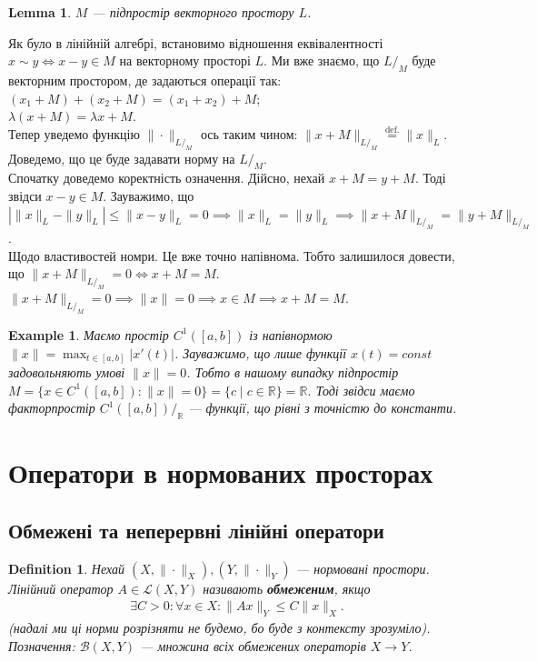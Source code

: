 \documentclass[a4paper, 10pt]{article}
\theoremstyle{theoremdd}
\theoremstyle{theoremdd}
\newtheorem{definition}[theorem]{Definition}
\theoremstyle{theoremdd}
\theoremstyle{theoremdd}
\newtheorem{example}[theorem]{Example}
\theoremstyle{theoremdd}
\theoremstyle{theoremdd}
\theoremstyle{theoremdd}
\newtheorem{lemma}[theorem]{Lemma}
\theoremstyle{theoremdd}
\begin{document}
\begin{lemma}
$M$ --- підпростір векторного простору $L$.
\end{lemma}

\noindent
Як було в лінійній алгебрі, встановимо відношення еквівалентності $x \sim y \iff x - y \in M$ на векторному просторі $L$. Ми вже знаємо, що $L/_M$ буде векторним простором, де задаються операції так:\\
$(x_1+M) + (x_2+M) = (x_1+x_2) + M$;\\
$\lambda(x+M) = \lambda x + M$.\\
Тепер уведемо функцію $\| \cdot\|_{L/_M}$ ось таким чином: $\| x+M \|_{L/_M} \overset{\text{def.}}{=} \|x\|_L$. Доведемо, що це буде задавати норму на $L/_M$.\\
Спочатку доведемо коректність означення. Дійсно, нехай $x+M = y+M$. Тоді звідси $x-y \in M$. Зауважимо, що\\
$| \|x \|_L - \|y\|_L | \leq \|x - y \|_L = 0 \implies \|x\|_L = \|y\|_L \implies \|x+M\|_{L/_M} = \|y+M\|_{L/_M}$.\\
Щодо властивостей номри. Це вже точно напівнома. Тобто залишилося довести, що $\|x+M\|_{L/_M} = 0 \iff x+M = M$.\\
$\|x+M\|_{L/_M} = 0 \implies \|x\| = 0 \implies x \in M \implies x+M=M$.

\begin{example}
Маємо простір $C^1([a,b])$ із напівнормою $\|x\| = \displaystyle\max_{t \in [a,b]} |x'(t)|$. Зауважимо, що лише функції $x(t) = const$ задовольняють умові $\|x\| = 0$. Тобто в нашому випадку підпростір $M = \{x \in C^1([a,b]) : \|x\| = 0\} = \{c \mid c \in \mathbb{R}\} = \mathbb{R}$. Тоді звідси маємо факторпростір $C^1([a,b])/_{\mathbb{R}}$ --- функції, що рівні з точністю до константи. 
\end{example}
\newpage

\section{Оператори в нормованих просторах}
\subsection{Обмежені та неперервні лінійні оператори}
\begin{definition}
Нехай $(X, \|\cdot \|_X),(Y, \| \cdot \|_Y)$ --- нормовані простори.\\
Лінійний оператор $A \in \mathcal{L}(X,Y)$ називають \textbf{обмеженим}, якщо
\begin{align*}
\exists C > 0: \forall x \in X: \| Ax \|_Y \leq C \| x \|_X.
\end{align*}
(\textit{надалі ми ці норми розрізняти не будемо, бо буде з контексту зрозуміло}).\\
\textit{Позначення}: $\mathcal{B}(X,Y)$ --- множина всіх обмежених операторів $X \to Y$.
\end{definition}
\end{document}
